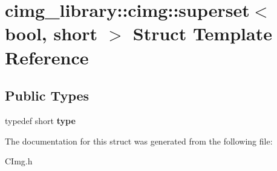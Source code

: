 \hypertarget{structcimg__library_1_1cimg_1_1superset_3_01bool_00_01short_01_4}{\section{cimg\-\_\-library\-:\-:cimg\-:\-:superset$<$ bool, short $>$ Struct Template Reference}
\label{structcimg__library_1_1cimg_1_1superset_3_01bool_00_01short_01_4}
}
\subsection*{Public Types}
\begin{DoxyCompactItemize}
\item 
\hypertarget{structcimg__library_1_1cimg_1_1superset_3_01bool_00_01short_01_4_a0fae1d8b6da36bbea975cb02dcb47272}{typedef short {\bfseries type}}\label{structcimg__library_1_1cimg_1_1superset_3_01bool_00_01short_01_4_a0fae1d8b6da36bbea975cb02dcb47272}

\end{DoxyCompactItemize}


The documentation for this struct was generated from the following file\-:\begin{DoxyCompactItemize}
\item 
C\-Img.\-h\end{DoxyCompactItemize}
